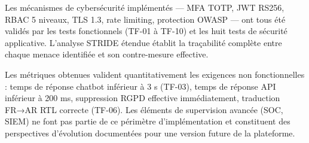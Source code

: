 Les mécanismes de cybersécurité implémentés — MFA TOTP, JWT RS256, RBAC 5 niveaux, TLS 1.3, rate limiting, protection OWASP — ont tous été validés par les tests fonctionnels (TF-01 à TF-10) et les huit tests de sécurité applicative. L'analyse STRIDE étendue établit la traçabilité complète entre chaque menace identifiée et son contre-mesure effective.

Les métriques obtenues valident quantitativement les exigences non fonctionnelles : temps de réponse chatbot inférieur à 3 s (TF-03), temps de réponse API inférieur à 200 ms, suppression RGPD effective immédiatement, traduction FR→AR RTL correcte (TF-06). Les éléments de supervision avancée (SOC, SIEM) ne font pas partie de ce périmètre d'implémentation et constituent des perspectives d'évolution documentées pour une version future de la plateforme.
